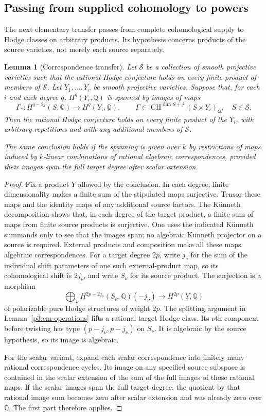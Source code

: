 \documentclass[11pt]{article}
\newcommand{\Q}{\mathbb Q}
\newcommand{\CH}{\operatorname{CH}}
\newtheorem{lemma}[theorem]{Lemma}
\numberwithin{equation}{section}
\begin{document}
\subsection{Passing from supplied cohomology to powers}

The next elementary transfer passes from complete cohomological supply
to Hodge classes on arbitrary products.  Its hypothesis concerns products
of the source varieties, not merely each source separately.

\begin{lemma}[Correspondence transfer]
\label{p3:correspondence-transfer}
Let $\mathscr S$ be a collection of smooth projective varieties such
that the rational Hodge conjecture holds on every finite product of
members of $\mathscr S$.  Let $Y_1,\ldots,Y_v$ be smooth projective
varieties.  Suppose that, for each $i$ and each degree $q$,
$H^q(Y_i,\Q)$ is spanned by images of maps
\[
 \Gamma_*:H^{q-2j}(S,\Q)\longrightarrow H^q(Y_i,\Q),
 \qquad
 \Gamma\in\CH^{\dim S+j}(S\times Y_i)_\Q,\quad S\in\mathscr S.
\]
Then the rational Hodge conjecture holds on every
finite product of the $Y_i$, with arbitrary repetitions and with
any additional members of $\mathscr S$.

The same conclusion holds if the spanning is given over $k$ by
restrictions of maps induced by $k$-linear combinations of
rational algebraic correspondences, provided their images span
the full target degree after scalar extension.
\end{lemma}

\begin{proof}
Fix a product $Y$ allowed by the conclusion.
In each degree, finite dimensionality makes a finite sum of the
stipulated maps surjective.  Tensor these maps and the identity maps
of any additional source factors.  The K\"unneth decomposition shows
that, in each degree of the target product, a finite sum of maps from
finite source products is surjective.  One uses the indicated
K\"unneth summands only to see that the images span; no algebraic
K\"unneth projector on a source is required.  External products and
composition make all these maps algebraic correspondences.
For a target degree $2p$, write $j_\nu$ for the sum of the individual
shift parameters of one such external-product map, so its cohomological
shift is $2j_\nu$, and write $S_\nu$ for its source
product.  The surjection is a morphism
\[
 \bigoplus_\nu H^{2p-2j_\nu}(S_\nu,\Q)(-j_\nu)
 \longrightarrow H^{2p}(Y,\Q)
\]
of polarizable pure Hodge structures of weight $2p$.
The splitting argument in Lemma~\ref{p3:cm-operations} lifts a
rational target Hodge class.  Its $\nu$th component before
twisting has type $(p-j_\nu,p-j_\nu)$ on $S_\nu$.
It is algebraic by the source hypothesis, so its image is algebraic.

For the scalar variant, expand each scalar correspondence into
finitely many rational correspondence cycles.  Its image on any
specified source subspace is contained in the scalar extension of
the sum of the full images of those rational maps.  If the scalar
images span the full target degree, the quotient by that rational
image sum becomes zero after scalar extension and was already
zero over $\Q$.  The first part therefore applies.
\end{proof}
\end{document}
